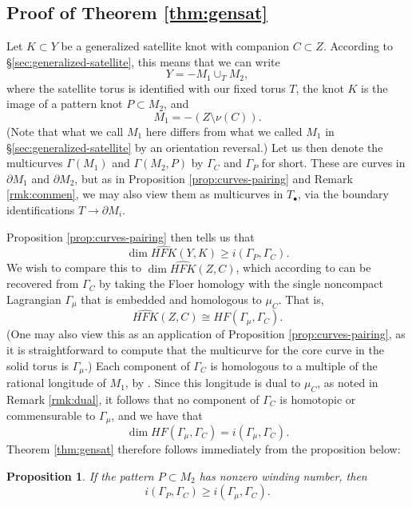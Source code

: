 \documentclass[11pt]{amsart}
\newtheorem {proposition}[theorem]{Proposition}
\numberwithin{equation}{section}
\numberwithin{theorem}{section}
\theoremstyle{definition}
\newcommand\HFK{\widehat{\mathit{HFK}}}
\newcommand{\HF}{\mathit{HF}}
\begin{document}
\subsection{Proof of Theorem \ref{thm:gensat}} 
Let $K\subset Y$ be a generalized satellite knot with companion $C\subset Z$. According to \S\ref{sec:generalized-satellite}, this means that we can write \[Y = -M_1 \cup_T M_2,\] where the satellite torus is identified with our fixed torus $T$, the knot $K$ is the image of a pattern knot $P\subset M_2$, and \[M_1 = -(Z\setminus \nu(C)).\] (Note that what we call $M_1$ here differs from what we called $M_1$ in \S\ref{sec:generalized-satellite} by an orientation reversal.) Let us then denote the multicurves $\Gamma(M_1)$ and $\Gamma(M_2,P)$ by $\Gamma_C$ and $\Gamma_P$ for short. These are curves in $\partial M_1$ and $\partial M_2$, but as in Proposition \ref{prop:curves-pairing} and Remark \ref{rmk:commen}, we may also view them as multicurves in $T_\bullet$, via the boundary identifications $T\to \partial M_i$. 

Proposition \ref{prop:curves-pairing} then tells us that
\[ \dim \HFK(Y, K) \ge i(\Gamma_P, \Gamma_C). \]
We wish to compare this to $\dim \HFK(Z, C)$, which according to \cite[Proposition~12]{hrw-properties} can be recovered from $\Gamma_C$ by taking the Floer homology with the single noncompact Lagrangian $\Gamma_\mu$ that is embedded and homologous to $\mu_C$. That is,
\[ \HFK(Z, C) \cong \HF(\Gamma_\mu, \Gamma_C). \]
(One may also view this as an application of Proposition \ref{prop:curves-pairing}, as it is straightforward to compute that the multicurve for the core curve in the solid torus is $\Gamma_\mu$.) Each component of $\Gamma_C$ is homologous to a multiple of the rational longitude of $M_1$, by \cite[Corollary~6.6]{hrw}. Since this longitude is dual to $\mu_C$, as noted in Remark \ref{rmk:dual}, it follows that no component of $\Gamma_C$ is homotopic or commensurable to $\Gamma_\mu$, and we have that
\[\dim \HF(\Gamma_\mu, \Gamma_C) = i(\Gamma_\mu, \Gamma_C).\]
Theorem \ref{thm:gensat} therefore follows immediately from the proposition below:

\begin{proposition}
If the pattern $P\subset M_2$ has nonzero winding number, then 
\[ i(\Gamma_P, \Gamma_C) \ge i(\Gamma_\mu, \Gamma_C). \]
\end{proposition}
\end{document}
